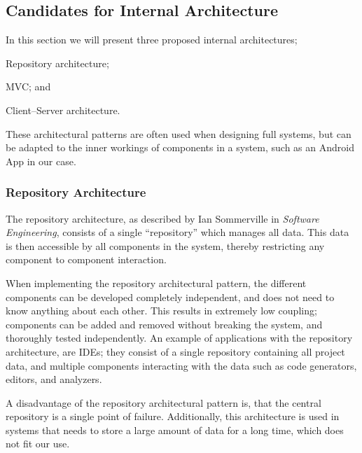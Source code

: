\subsection{Candidates for Internal Architecture}
In this section we will present three proposed internal architectures;
\begin{eletterate*}
    \item Repository architecture;
    \item \ac{MVC}; and
    \item Client--Server architecture.
\end{eletterate*}
These architectural patterns are often used when designing full systems, but can be adapted to the inner workings of components in a system, such as an Android App in our case.

\subsubsection{Repository Architecture}
The repository architecture, as described by Ian Sommerville in \textit{Software Engineering}\cite[p. 179-180]{sommerville}, consists of a single \enquote{repository} which manages all data.
This data is then accessible by all components in the system, thereby restricting any component to component interaction.

When implementing the repository architectural pattern, the different components can be developed completely independent, and does not need to know anything about each other.
This results in extremely low coupling; components can be added and removed without breaking the system, and thoroughly tested independently.
An example of applications with the repository architecture, are IDEs; they consist of a single repository containing all project data, and multiple components interacting with the data such as code generators, editors, and analyzers.

A disadvantage of the repository architectural pattern is, that the central repository is a single point of failure.
Additionally, this architecture is used in systems that needs to store a large amount of data for a long time, which does not fit our use.

